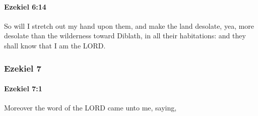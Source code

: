		\paragraph{Ezekiel 6:14} %
			\label{EZEKIEL-6-14}

			So will I stretch out my hand upon them, and make the land desolate, yea, more desolate than the wilderness toward Diblath, in all their habitations: and they shall know that I am the LORD.

	\subsubsection{Ezekiel 7} %
		\label{EZEKIEL-7}

		\paragraph{Ezekiel 7:1} %
			\label{EZEKIEL-7-1}

			Moreover the word of the LORD came unto me, saying,

